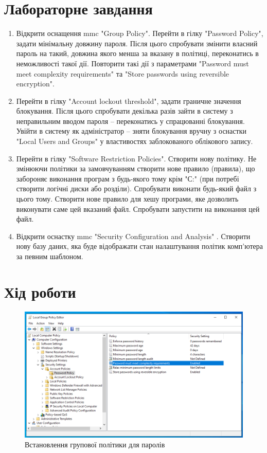 \documentclass[oneside,14pt]{extarticle}
\begin{document}
\begin{normalsize}
    \section*{Лабораторне завдання}
	\begin{enumerate}
		\item Відкрити оснащення mmc "Group Policy". Перейти в гілку "Password
		Policy", задати мінімальну довжину пароля. Після цього
		спробувати змінити власний пароль на такий, довжина якого менша за вказану в
		політиці, переконатись в неможливості такої дії. Повторити такі дії з
		параметрами "Password must meet complexity requirements" та "Store passwords
		using reversible encryption".
		\item Перейти в гілку "Account lockout threshold", задати граничне
		значення блокування. Після цього спробувати декілька разів зайти в
		систему з неправильним вводом пароля – переконатись у спрацюванні
		блокування. Увійти в систему як адміністратор – зняти блокування
		вручну з оснастки "Local Users and Groups" у властивостях заблокованого
		облікового запису.
		\item Перейти в гілку "Software Restriction Policies". Створити
		нову політику. Не змінюючи політики за замовчуванням створити нове правило
		(правила), що забороняє виконання програм з будь-якого тому крім "С:" (при
		потребі створити логічні диски або розділи). Спробувати виконати
		будь-який файл з цього тому. Створити нове правило для хешу
		програми, яке дозволить виконувати саме цей вказаний файл.
		Спробувати запустити на виконання цей файл.
		\item Відкрити оснастку mmc "Security Configuration and Analysis" . Створити нову базу даних, яка буде відображати стан налаштування політик
		комп’ютера за певним шаблоном.
	\end{enumerate}

	\section*{Хід роботи}
	
	\begin{figure}[H]
		\centering
		\includegraphics[width=\columnwidth]{1}
		\caption{Встановлення групової політики для паролів}
	\end{figure}
	

\end{normalsize}
\end{document}
